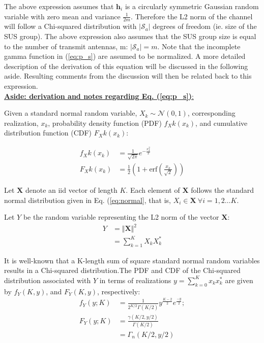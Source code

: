 The above expression assumes that $\textbf{h}_i$ is a circularly symmetric Gaussian random variable with zero mean and variance  $\frac{1}{2m}$. Therefore the L2 norm of the channel will follow a Chi-squared distribution with $\vert \mathcal{S}_a\vert$ degrees of freedom (ie. size of the SUS group). The above expression also assumes that the SUS group size is equal to the number of transmit antennas, m: $\vert \mathcal{S}_a\vert = m$. Note that the incomplete gamma function in (\ref{eq:p_s}) are assumed to be normalized. A more detailed description of the derivation of this equation will be discussed in the following aside. Resulting comments from the discussion will then be related back to this expression.\\
\underline{\textbf{Aside: derivation and notes regarding Eq. (\ref{eq:p_s})}:}

 Given a standard normal random variable, $X_k\sim\mathcal{N}(0,1)$, corresponding realization, $x_k$, probability density function (PDF) $f_Xk(x_k)$, and cumulative distribution function (CDF) $F_Xk(x_k)$:

\begin{equation}\label{eq:normal}
    \begin{aligned}
        f_Xk(x_k) &= \frac{1}{\sqrt{2\pi}}e^{-\frac{x_k^2}{2}}\\
        F_Xk(x_k) &=\frac{1}{2}(1+\text{erf}(\frac{x_k}{\sqrt{2}}))
    \end{aligned}
\end{equation}

Let $\textbf{X}$ denote an iid vector of length $K$. Each element of $\textbf{X}$ follows the standard normal distribution given in Eq. (\ref{eq:normal}, that is, $X_i\in\textbf{X}\ \forall i = 1,2\ldots K$.

Let $Y$ be the random variable representing the L2 norm of the vector $\textbf{X}$:
\begin{equation}\label{eq:ch_sq_sum}
    \begin{aligned}
        Y &= \Vert \textbf{X} \Vert^2\\
          &= \sum_{k = 1}^K X_kX_k^*
    \end{aligned}
\end{equation}

It is well-known that a K-length sum of square standard normal random variables results in a Chi-squared distribution.The PDF and CDF of the Chi-squared distribution associated with $Y$ in terms of realizations $y = \sum_{k=0}^K x_k x_k^*$ are given by $f_Y(K,y)$, and $F_Y(K,y)$, respectively:
\begin{equation}\label{eq:ch_sq}
    \begin{aligned}
        f_Y(y;K) &= \frac{1}{2^{K/2}\Gamma(K/2)}y^{\frac{K-2}{2}}e^{\frac{-y}{2}};\\
        F_Y(y;K) &= \frac{\gamma(K/2,y/2)}{\Gamma(K/2)}\\
        &= \Gamma_n(K/2,y/2)
    \end{aligned}
\end{equation}

